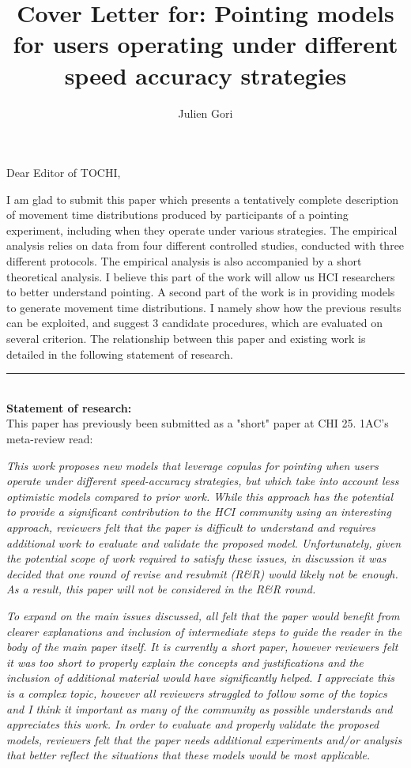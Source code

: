 \documentclass{article}
\title{Cover Letter for: Pointing models for users operating under different speed accuracy strategies}
\author{Julien Gori}
\begin{document}
\maketitle


Dear Editor of TOCHI, 

\vspace{2\baselineskip}


I am glad to submit this paper which presents a tentatively complete description of movement time distributions produced by participants of a pointing experiment, including when they operate under various strategies. The empirical analysis relies on data from four different controlled studies, conducted with three different protocols. The empirical analysis is also accompanied by a short theoretical analysis. I believe this part of the work will allow us HCI researchers to better understand pointing.
A second part of the work is in providing models to generate movement time distributions. I namely show how the previous results can be exploited, and suggest 3 candidate procedures, which are evaluated on several criterion. 
The relationship between this paper and existing work is detailed in the following statement of research.

\noindent\rule{\textwidth}{0.4pt}\\
\textbf{Statement of research:}\\
This paper has previously been submitted as a "short" paper at CHI 25. 1AC's meta-review read:


\textit{This work proposes new models that leverage copulas for pointing when users operate under different speed-accuracy strategies, but which take into account less optimistic models compared to prior work. While this approach has the potential to provide a significant contribution to the HCI community using an interesting approach, reviewers felt that the paper is difficult to understand and requires additional work to evaluate and validate the proposed model. Unfortunately, given the potential scope of work required to satisfy these issues, in discussion it was decided that one round of revise and resubmit (R\&R) would likely not be enough. As a result, this paper will not be considered in the R\&R round.}

\textit{To expand on the main issues discussed, all felt that the paper would benefit from clearer explanations and inclusion of intermediate steps to guide the reader in the body of the main paper itself. It is currently a short paper, however reviewers felt it was too short to properly explain the concepts and justifications and the inclusion of additional material would have significantly helped. I appreciate this is a complex topic, however all reviewers struggled to follow some of the topics and I think it important as many of the community as possible understands and appreciates this work. In order to evaluate and properly validate the proposed models, reviewers felt that the paper needs additional experiments and/or analysis that better reflect the situations that these models would be most applicable.}
\end{document}

